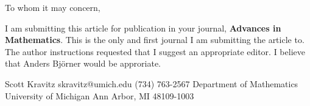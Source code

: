 \documentclass{elsart}
\begin{document}
To whom it may concern,

I am submitting this article for publication in your journal, {\bf Advances in Mathematics}. This is the only and first 
journal I am submitting the article to. The author instructions requested that I suggest an appropriate editor. I believe 
that Anders Bj\"orner would be approriate.


Scott Kravitz \newline
skravitz@umich.edu \newline
(734) 763-2567 \newline
Department of Mathematics \newline
University of Michigan \newline
Ann Arbor, MI 48109-1003
\end{document}
